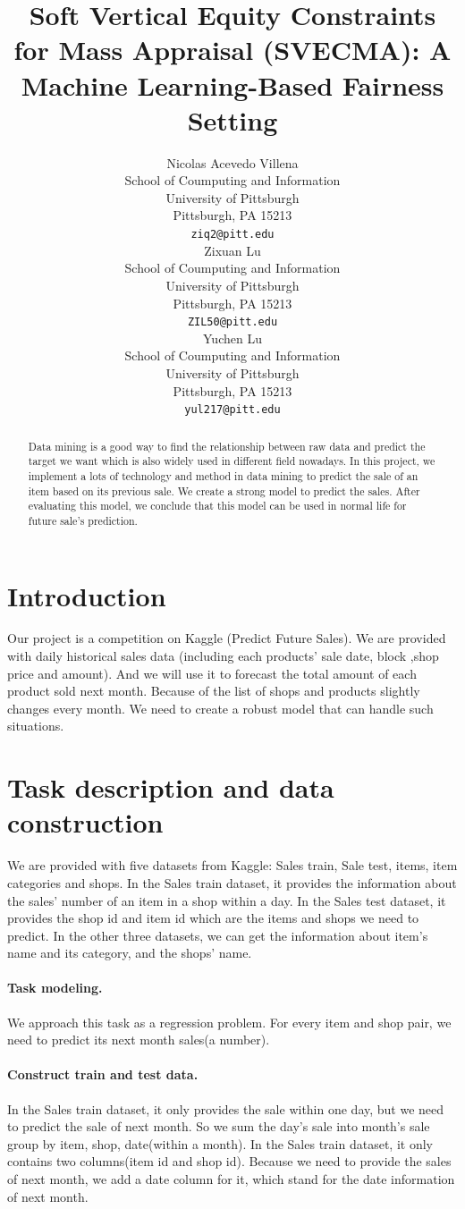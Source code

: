 \documentclass{article}
\title{Soft Vertical Equity Constraints for Mass Appraisal (SVECMA): A Machine Learning-Based Fairness Setting}
\author{
 Nicolas Acevedo Villena \\
  School of Coumputing and Information\\
  University of Pittsburgh\\
  Pittsburgh, PA 15213 \\
  \texttt{ziq2@pitt.edu} \\
   \And
 Zixuan Lu \\
  School of Coumputing and Information\\
  University of Pittsburgh\\
  Pittsburgh, PA 15213 \\
  \texttt{ZIL50@pitt.edu} \\
  \And
 Yuchen Lu \\
  School of Coumputing and Information\\
  University of Pittsburgh\\
  Pittsburgh, PA 15213 \\
  \texttt{yul217@pitt.edu} \\
}
\begin{document}
\maketitle
\begin{abstract}
Data mining is a good way to find the relationship between raw data and predict the target we want which is also widely used in different field nowadays. In this project, we implement a lots of technology and method in data mining to predict the sale of an item based on its previous sale. We create a strong model to predict the sales. After evaluating this model, we conclude that this model can be used in normal life for future sale’s prediction. 
\end{abstract}




\section{Introduction}
Our project is a competition on Kaggle (Predict Future Sales). We are provided with daily historical sales data (including each products’ sale date, block ,shop price and amount). And we will use it to forecast the total amount of each product sold next month. Because of the list of shops and products slightly changes every month. We need to create a robust model that can handle such situations.


\section{Task description and data construction}
\label{sec:headings}
We are provided with five datasets from Kaggle: Sales train, Sale test, items, item categories and shops. In the Sales train dataset, it provides the information about the sales’ number of an item in a shop within a day. In the Sales test dataset, it provides the shop id and item id which are the items and shops we need to predict. In the other three datasets, we can get the information about item’s name and its category, and the shops’ name.
\paragraph{Task modeling.}
We approach this task as a regression problem. For every item and shop pair, we need to predict its next month sales(a number).
\paragraph{Construct train and test data.}
In the Sales train dataset, it only provides the sale within one day, but we need to predict the sale of next month. So we sum the day's sale into month's sale group by item, shop, date(within a month).
In the Sales train dataset, it only contains two columns(item id and shop id). Because we need to provide the sales of next month, we add a date column for it, which stand for the date information of next month.
\end{document}
